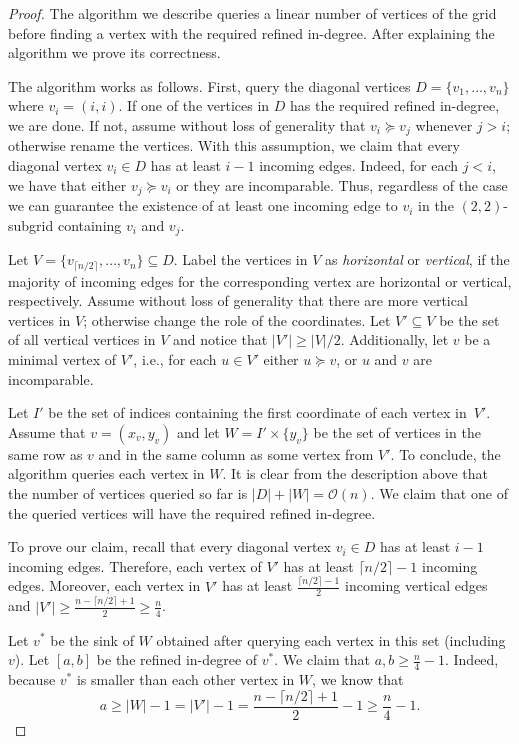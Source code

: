 \documentclass[a4paper,10pt]{article}
\newcommand{\indegree}{refined in-degree\xspace}
\begin{document}
\begin{proof}
The algorithm we describe queries a linear number of vertices of the grid before finding a vertex with the required \indegree. 
After explaining the algorithm we prove its correctness.
  
The algorithm works as follows. First, query the diagonal vertices $D = \{v_1,\ldots, v_n\}$ where $v_i = (i,i)$. If one of the vertices in $D$ has the required \indegree, we are done. If not, assume without loss of generality that $v_i \succeq v_j$ whenever $j > i$; otherwise rename the vertices. 
With this assumption, we claim that every diagonal vertex $v_i \in D$ has at least $i - 1$ incoming edges. Indeed, for each $j < i$, we have that either $v_j \succeq v_i$ or they are incomparable. Thus, regardless of the case we can guarantee the existence of at least one incoming edge to $v_i$ in the $(2, 2)$-subgrid containing $v_i$ and $v_j$. 

Let $V = \{v_{\lceil n/2 \rceil},\ldots,v_n\} \subseteq D$.
Label the vertices in $V$ as \emph{horizontal}  or \emph{vertical}, if the majority of incoming edges for the corresponding vertex are horizontal  or vertical, respectively. 
Assume without loss of generality that there are more vertical vertices in $V$; otherwise change the role of the coordinates. 
Let $V' \subseteq V$ be the set of all vertical vertices in $V$ and notice that $|V'| \geq |V|/2$.
 Additionally, let $v$ be a minimal vertex of $V'$, i.e., for each $u\in V'$ either $u\succeq v$, or $u$ and $v$ are incomparable. 

Let $I'$ be the set of indices containing the first coordinate of each vertex in~$V'$.
Assume that $v = (x_v, y_v)$ and let $W = I'\times \{y_v\}$ be the set of vertices in the same row as $v$ and in the same column as some vertex from $V'$.
To conclude, the algorithm queries each vertex in $W$.
It is clear from the description above that the number of vertices queried so far is $|D| + |W| = \mathcal{O}(n)$. 
We claim that one of the queried vertices will have the required \indegree.

To prove our claim, recall that every diagonal vertex $v_i \in D$ has at least $i - 1$ incoming edges.  
Therefore, each vertex of $V'$ has at least $\lceil n/2 \rceil - 1$ incoming edges. 
Moreover, each vertex in $V'$ has at least $\frac{\lceil n/2\rceil-1}{2}$ incoming vertical edges and $|V'| \geq \frac{n-\lceil n/2\rceil + 1}{2} \geq \frac{n}{4}$. 

Let $v^*$ be the sink of $W$ obtained after querying each vertex in this set (including $v$). Let $[a,b]$ be the \indegree of $v^*$. We claim that $a, b \geq \frac{n}{4} - 1$. 
Indeed, because $v^*$ is smaller than each other vertex in $W$, we know that $$a \geq |W|-1 = |V'|-1 = \frac{n-\lceil n/2\rceil + 1}{2} - 1 \geq \frac{n}{4} - 1.$$



\end{proof}
\end{document}
